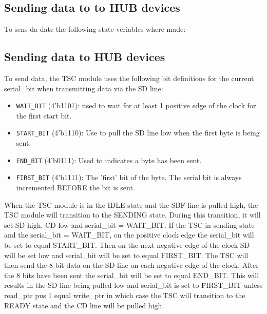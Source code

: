 \subsection{Sending data to to HUB devices}
To sens da date the following state veriables where made:

\subsection{Sending data to HUB devices}
To send data, the TSC module uses the following bit definitions for the current serial\_bit
when transmitting data via the SD line:

\begin{itemize}
      \item \texttt{WAIT\_BIT} (4'b1101): used to wait for at least 1 positive edge of the clock for the first start bit.
      \item \texttt{START\_BIT} (4'b1110): Use to pull the SD line low when the first byte is being sent.
      \item \texttt{END\_BIT} (4'b0111): Used to indicates a byte has been sent.
      \item \texttt{FIRST\_BIT} (4'b1111): The 'first' bit of the byte.
            The serial bit is always incremented BEFORE the bit is sent.
\end{itemize}

When the TSC module is in the IDLE state and the SBF line is pulled high,
the TSC module will transition to the SENDING state. During this transition, it will set SD high, CD low and serial\_bit = WAIT\_BIT.
If the TSC in sending state and the serial\_bit = WAIT\_BIT, on the positive clock edge the serial\_bit will be set to equal START\_BIT.
Then on the next negative edge of the clock SD will be set low and serial\_bit will be set to equal FIRST\_BIT.
The TSC will then send the 8 bit data on the SD line on each negative edge of the clock.
After the 8 bits have been sent the serial\_bit will be set to equal END\_BIT.
This will results in the SD line being pulled low and serial\_bit is set to \= FIRST\_BIT unless read\_ptr pus 1 equal write\_ptr in
which case the TSC will transition to the READY state and the CD line will be pulled high.



















